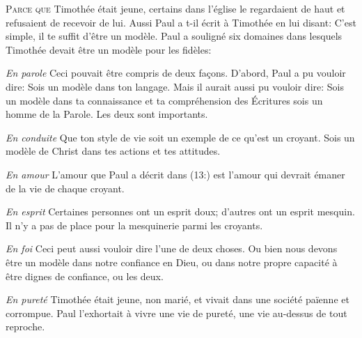 \lettrine{P}{arce que} Timothée était jeune, certains dans l'église
 le regardaient de haut et refusaient de recevoir de lui.
 Aussi Paul a t-il écrit à Timothée en lui disant: 
 \Og C'est simple, il te suffit d'être un modèle. \Fg{}
 Paul a souligné six domaines dans lesquels Timothée
 devait être un modèle pour les fidèles:


\emph{En parole} \ocadr
 Ceci pouvait être compris de deux fa\c{c}ons.
 D'abord, Paul a pu vouloir dire: 
 \Og Sois un modèle dans ton langage. \Fg{}
 Mais il aurait aussi pu vouloir dire: 
 \Og Sois un modèle dans ta connaissance et ta compréhension des Écritures
 \ocadr sois un homme de la Parole. \Fg{} Les deux sont importants.

\emph{En conduite} \ocadr
 Que ton style de vie soit un exemple de ce qu'est un croyant.
 Sois un modèle de Christ dans tes actions et tes attitudes.

\emph{En amour} \ocadr
 L'amour que Paul a décrit dans (13:) 
 est l'amour qui devrait émaner de la vie de chaque croyant.

\emph{En esprit} \ocadr
 Certaines personnes ont un esprit doux; d'autres ont un esprit mesquin.
 Il n'y a pas de place pour la mesquinerie parmi les croyants.

\emph{En foi} \ocadr
 Ceci peut aussi vouloir dire l'une de deux choses.
 Ou bien nous devons être un modèle dans notre confiance en Dieu,
 ou dans notre propre capacité à être dignes de confiance, ou les deux.

\emph{En pureté} \ocadr
 Timothée était jeune, non marié, et vivait dans une société païenne
 et corrompue. Paul l'exhortait à vivre une vie de pureté,
 une vie au-dessus de tout reproche.



\dvrule





